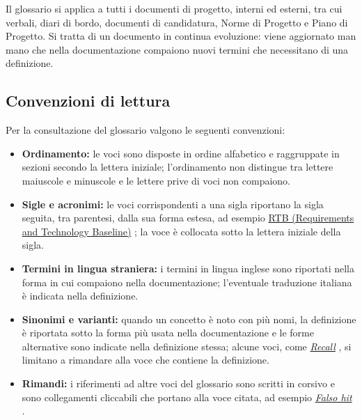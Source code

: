 \documentclass[a4paper, 11pt]{article}
\makeatletter
\newcommand{\VoceGlossario}[3]{%
    \ifcsname bitcrusherglossario@#1\endcsname
        \PackageError{Glossario}{Identificatore duplicato: #1}%
            {Assegnare un identificatore diverso a ogni voce.}%
    \else
        \expandafter\gdef\csname bitcrusherglossario@#1\endcsname{}%
        \par\addvspace{\baselineskip}%
        \noindent\hypertarget{gls-#1}{\textbf{#2}}\par
        \nopagebreak\smallskip
        \noindent #3\par
    \fi
}
\newcommand{\RifGlossario}[2]{%
    \hyperlink{gls-#1}{#2}%
}
\makeatother
\begin{document}
Il glossario si applica a tutti i documenti di progetto, interni ed esterni, tra cui verbali, diari di bordo, documenti di candidatura, Norme di Progetto e Piano di Progetto. Si tratta di un documento in continua evoluzione: viene aggiornato man mano che nella documentazione compaiono nuovi termini che necessitano di una definizione.

\subsection{Convenzioni di lettura}
Per la consultazione del glossario valgono le seguenti convenzioni:
\begin{itemize}
    \item \textbf{Ordinamento:} le voci sono disposte in ordine alfabetico e raggruppate in sezioni secondo la lettera iniziale; l'ordinamento non distingue tra lettere maiuscole e minuscole e le lettere prive di voci non compaiono.
    \item \textbf{Sigle e acronimi:} le voci corrispondenti a una sigla riportano la sigla seguita, tra parentesi, dalla sua forma estesa, ad esempio \RifGlossario{rtb}{RTB (Requirements and Technology Baseline)}; la voce è collocata sotto la lettera iniziale della sigla.
    \item \textbf{Termini in lingua straniera:} i termini in lingua inglese sono riportati nella forma in cui compaiono nella documentazione; l'eventuale traduzione italiana è indicata nella definizione.
    \item \textbf{Sinonimi e varianti:} quando un concetto è noto con più nomi, la definizione è riportata sotto la forma più usata nella documentazione e le forme alternative sono indicate nella definizione stessa; alcune voci, come \RifGlossario{recall}{\textit{Recall}}, si limitano a rimandare alla voce che contiene la definizione.
    \item \textbf{Rimandi:} i riferimenti ad altre voci del glossario sono scritti in corsivo e sono collegamenti cliccabili che portano alla voce citata, ad esempio \RifGlossario{falso-hit}{\textit{Falso hit}}.
\end{itemize}

\newpage

\end{document}
